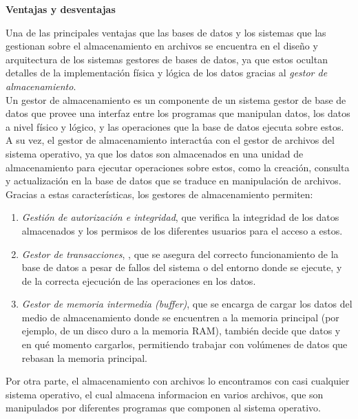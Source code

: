 \documentclass[a4paper,12pt]{report}
\begin{document}
\newpage

\textbf{\Large Ventajas y desventajas}\\

\vspace{1cm}

Una de las principales ventajas que las bases de datos y los sistemas que las gestionan sobre el almacenamiento en archivos se encuentra en el diseño y arquitectura de los sistemas gestores de bases de datos, ya que estos ocultan detalles de la implementación física y lógica de los datos gracias al \emph{gestor de almacenamiento}.
\\
Un gestor de almacenamiento es un componente de un sistema gestor de base de datos que provee una interfaz entre los programas que manipulan datos, los datos a nivel físico y lógico, y las operaciones que la base de datos ejecuta sobre estos. A su vez, el gestor de almacenamiento interactúa con el gestor de archivos del sistema operativo, ya que los datos son almacenados en una unidad de almacenamiento para ejecutar operaciones sobre estos, como la creación, consulta y actualización en la base de datos que se traduce en manipulación de archivos.\\

Gracias a estas características, los gestores de almacenamiento permiten:\\

\begin{enumerate}
	\item\emph{Gestión de autorización e integridad}, que verifica la integridad de los datos almacenados y los permisos de los diferentes usuarios para el acceso a estos.
	\item\emph{Gestor de transacciones}, , que se asegura del correcto funcionamiento de la base de datos a pesar de fallos del sistema o del entorno donde se ejecute, y de la correcta ejecución de las operaciones en los datos.
	\item\emph{Gestor de memoria intermedia (buffer)}, que se encarga de cargar los datos del medio de almacenamiento donde se encuentren a la memoria principal (por ejemplo, de un disco duro a la memoria RAM), también decide que datos y en qué momento cargarlos, permitiendo trabajar con volúmenes de datos que rebasan la memoria principal.
\end{enumerate}

Por otra parte, el almacenamiento con archivos lo encontramos con casi cualquier sistema operativo, el cual almacena informacion en varios archivos, que son manipulados por diferentes programas que componen al sistema operativo.\\
\end{document}
